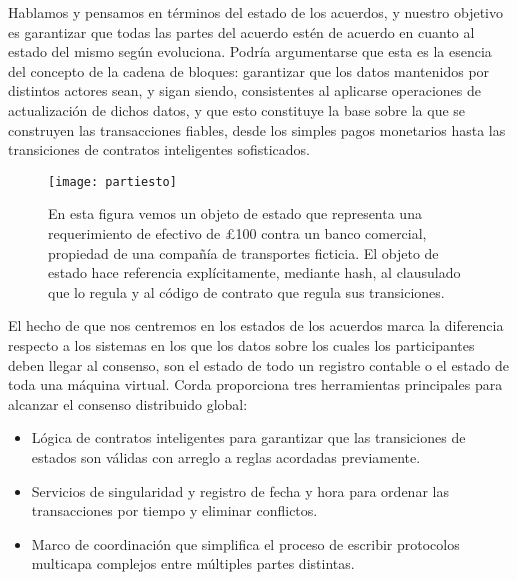 \documentclass{article}
\begin{document}
Hablamos y pensamos en términos del estado de los acuerdos, y nuestro objetivo es garantizar que todas las partes del acuerdo estén de acuerdo en cuanto al estado del mismo según evoluciona. Podría argumentarse que esta es la esencia del concepto de la cadena de bloques: garantizar que los datos mantenidos por distintos actores sean, y sigan siendo, consistentes al aplicarse operaciones de actualización de dichos datos, y que esto constituye la base sobre la que se construyen las transacciones fiables, desde los simples pagos monetarios hasta las transiciones de contratos inteligentes sofisticados.

\begin{figure}[H]
\texttt{[image: partiesto]}
\caption{En esta figura vemos un objeto de estado que representa una requerimiento de efectivo de \pounds100 contra un banco comercial, propiedad de una compañía de transportes ficticia.  El objeto de estado hace referencia explícitamente, mediante hash, al clausulado que lo regula y al código de contrato que regula sus transiciones.}
\end{figure}

El hecho de que nos centremos en los estados de los acuerdos marca la diferencia respecto a los sistemas en los que los datos sobre los cuales los participantes deben llegar al consenso, son el estado de todo un registro contable o el estado de toda una máquina virtual. Corda proporciona tres herramientas principales para alcanzar el consenso distribuido global:
\begin{itemize}
    \item Lógica de contratos inteligentes para garantizar que las transiciones de estados son válidas con arreglo a reglas acordadas previamente.
    \item Servicios de singularidad y registro de fecha y hora para ordenar las transacciones por tiempo y eliminar conflictos.
    \item Marco de coordinación que simplifica el proceso de escribir protocolos multicapa complejos entre múltiples partes distintas.
    \end{itemize}
    
\end{document}
